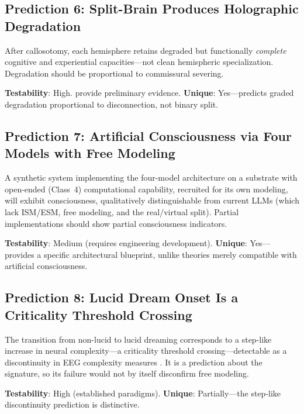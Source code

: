 \documentclass[12pt]{article}
\begin{document}
\subsection{Prediction 6: Split-Brain Produces Holographic Degradation}

After callosotomy, each hemisphere retains degraded but functionally \emph{complete} cognitive and experiential capacities---\hspace{0pt}not clean hemispheric specialization. Degradation should be proportional to commissural severing.

\textbf{Testability}: High. \citet{Pinto2017} provide preliminary evidence. \textbf{Unique}: Yes---\hspace{0pt}predicts graded degradation proportional to disconnection, not binary split.


\subsection{Prediction 7: Artificial Consciousness via Four Models with Free Modeling}

A synthetic system implementing the four-model architecture on a substrate with open-ended (Class~4) computational capability, recruited for its own modeling, will exhibit consciousness, qualitatively distinguishable from current LLMs (which lack ISM/ESM, free modeling, and the real/virtual split). Partial implementations should show partial consciousness indicators.

\textbf{Testability}: Medium (requires engineering development). \textbf{Unique}: Yes---\hspace{0pt}provides a specific architectural blueprint, unlike theories merely compatible with artificial consciousness.


\subsection{Prediction 8: Lucid Dream Onset Is a Criticality Threshold Crossing}

The transition from non-lucid to lucid dreaming corresponds to a step-like increase in neural complexity---\hspace{0pt}a criticality threshold crossing---\hspace{0pt}detectable as a discontinuity in EEG complexity measures \citep{LaBerge1985}. It is a prediction about the signature, so its failure would not by itself disconfirm free modeling.

\textbf{Testability}: High (established paradigms). \textbf{Unique}: Partially---\hspace{0pt}the step-like discontinuity prediction is distinctive.
\end{document}
